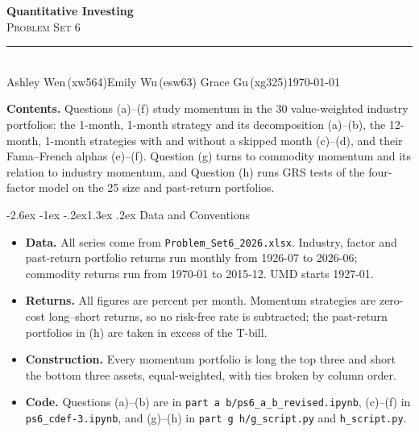 \documentclass[11pt]{article}
\makeatletter
\renewcommand\section{\@startsection{section}{1}{0pt}%
  {-2.6ex \@plus -1ex \@minus -.2ex}{1.3ex \@plus .2ex}%
  {\normalfont\scshape\large\color{psink}}}   %
\newenvironment{tight}
  {\begin{itemize}\setlength{\itemsep}{3pt}\setlength{\parskip}{0pt}%
   \setlength{\topsep}{3pt}\setlength{\leftmargini}{1.4em}}
  {\end{itemize}}
\makeatother
\begin{document}
\thispagestyle{empty}
\begin{flushleft}
{\bfseries\LARGE\color{psink} Quantitative Investing}\\[3pt]
{\scshape\Large\color{psink} Problem Set 6}\\[10pt]
{\color{psrule}\rule{\textwidth}{1.2pt}}\\[5pt]
{\small Ashley Wen\,(xw564)\quad\textbar\quad Emily Wu\,(esw63)%
\quad\textbar\quad Grace Gu\,(xg325)\hfill \today}
\end{flushleft}

\vspace{1.4em}

{\color{psink}\textbf{Contents.}} Questions (a)--(f) study momentum in the 30 value-weighted
industry portfolios: the 1-month, 1-month strategy and its decomposition (a)--(b), the
12-month, 1-month strategies with and without a skipped month (c)--(d), and their
Fama--French alphas (e)--(f). Question (g) turns to commodity momentum and its relation to
industry momentum, and Question (h) runs GRS tests of the four-factor model on the 25 size
and past-return portfolios.

\vspace{0.8em}

\section{Data and Conventions}

\begin{tight}
  \item \textbf{Data.} All series come from \texttt{Problem\_Set6\_2026.xlsx}. Industry,
  factor and past-return portfolio returns run monthly from 1926-07 to 2026-06; commodity
  returns run from 1970-01 to 2015-12. UMD starts 1927-01.
  \item \textbf{Returns.} All figures are percent per month. Momentum strategies are
  zero-cost long--short returns, so no risk-free rate is subtracted; the past-return
  portfolios in (h) are taken in excess of the T-bill.
  \item \textbf{Construction.} Every momentum portfolio is long the top three and short the
  bottom three assets, equal-weighted, with ties broken by column order.
  \item \textbf{Code.} Questions (a)--(b) are in \texttt{part a b/ps6\_a\_b\_revised.ipynb},
  (c)--(f) in \texttt{ps6\_cdef-3.ipynb}, and (g)--(h) in \texttt{part g h/g\_script.py} and
  \texttt{h\_script.py}.
\end{tight}
\end{document}
